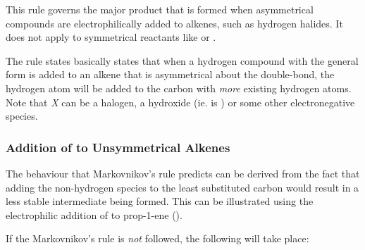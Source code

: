 		This rule governs the major product that is formed when asymmetrical compounds are electrophilically added to alkenes,
		such as hydrogen halides. It does not apply to symmetrical reactants like  or .

		The rule states basically states that when a hydrogen compound with the general form  is added to an
		alkene that is asymmetrical about the double-bond, the hydrogen atom will be added to the carbon with \textit{more}
		existing hydrogen atoms. Note that \textit{X} can be a halogen, a hydroxide (ie.  is ) or some other
		electronegative species.











	\pagebreak
	\subsubsection{Addition of  to Unsymmetrical Alkenes}

		The behaviour that Markovnikov's rule predicts can be derived from the fact that adding the non-hydrogen species to the least substituted carbon would
		result in a less stable intermediate being formed. This can be illustrated using the electrophilic addition of
		 to prop-1-ene ().

		If the Markovnikov's rule is \textit{not} followed, the following will take place:



